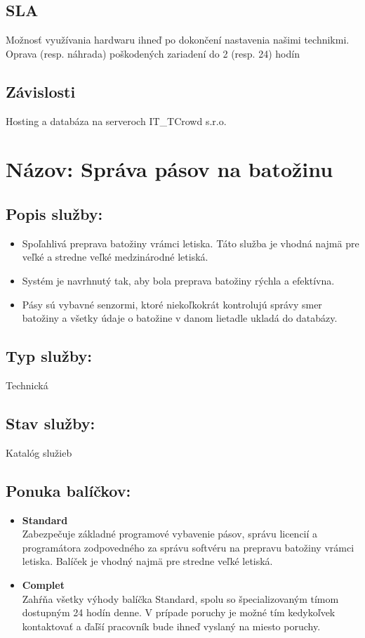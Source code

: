 \documentclass[a4paper, 11pt]{article}
\begin{document}
\subsection*{SLA}
Možnosť využívania hardwaru ihneď po dokončení nastavenia našimi technikmi. Oprava (resp. náhrada) poškodených zariadení do 2 (resp. 24) hodín
\subsection*{Závislosti}
Hosting a databáza na serveroch IT\_TCrowd s.r.o.

\section*{Názov: Správa pásov na batožinu}
\subsection*{Popis služby:}
\begin{itemize}
\item Spoľahlivá preprava batožiny vrámci letiska. Táto služba je vhodná najmä pre veľké a stredne veľké medzinárodné letiská. 
\item Systém je navrhnutý tak, aby bola preprava batožiny rýchla a efektívna. 
\item Pásy sú vybavné senzormi, ktoré niekoľkokrát kontrolujú správy smer batožiny a všetky údaje o batožine v danom lietadle ukladá do databázy.
\end{itemize}
\subsection*{Typ služby:} Technická
\subsection*{Stav služby:} Katalóg služieb
\subsection*{Ponuka balíčkov:}
\begin{itemize}
\item \textbf{Standard} \\
Zabezpečuje základné programové vybavenie pásov, správu licencií a programátora zodpovedného za správu softvéru na prepravu batožiny vrámci letiska. Balíček je vhodný najmä pre stredne veľké letiská.
\item \textbf{Complet} \\
Zahŕňa všetky výhody balíčka Standard, spolu so špecializovaným tímom dostupným 24 hodín denne. V prípade poruchy je možné tím kedykoľvek kontaktovať a ďaľší pracovník bude ihneď vyslaný na miesto poruchy.
\end{itemize}
\end{document}
